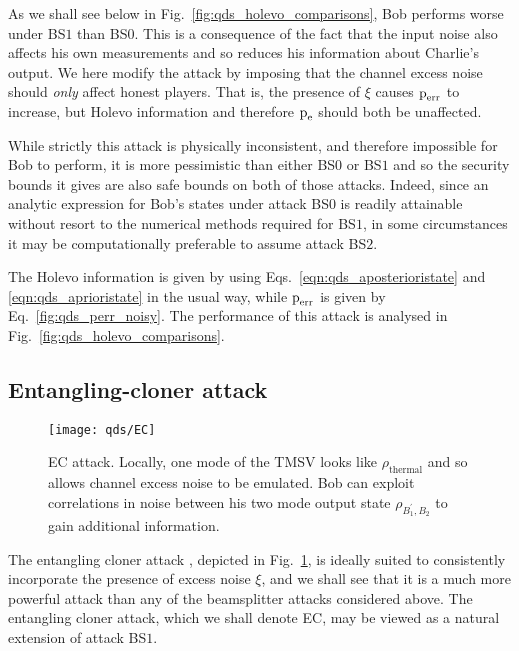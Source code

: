 As we shall see below in Fig.~\ref{fig:qds_holevo_comparisons}, Bob performs worse under BS$1$ than BS$0$. This is a consequence of the fact that the input noise also affects his own measurements and so reduces his information about Charlie's output. We here modify the attack by imposing that the channel excess noise should \emph{only} affect honest players. That is, the presence of $\xi$ causes $\text{p}_{\text{err}}$ to increase, but Holevo information and therefore $\text{p}_{\text{e}}$ should both be unaffected. 

While strictly this attack is physically inconsistent, and therefore impossible for Bob to perform, it is more pessimistic than either BS$0$ or BS$1$ and so the security bounds it gives are also safe bounds on both of those attacks. Indeed, since an analytic expression for Bob's states under attack BS$0$ is readily attainable without resort to the numerical methods required for BS$1$, %
in some circumstances it may be computationally preferable to assume attack BS$2$.

The Holevo information is given by using Eqs.~\ref{eqn:qds_aposterioristate} and \ref{eqn:qds_aprioristate} in the usual way, while $\text{p}_{\text{err}}$ is given by Eq.~\ref{fig:qds_perr_noisy}. The performance of this attack is analysed in Fig.~\ref{fig:qds_holevo_comparisons}.

\subsection{Entangling-cloner attack}
\begin{figure}[htp]
\centering
\texttt{[image: qds/EC]}
\caption{\label{fig:ec_attack} EC attack. Locally, one mode of the TMSV looks like $\rho_{\text{thermal}}$ and so allows channel excess noise to be emulated. Bob can exploit correlations in noise between his two mode output state $\rho_{B_1^\prime, B_2}$ to gain additional information.}
\end{figure}
The entangling cloner attack \cite{Grosshans2002, Grosshans2003}, depicted in Fig.~\ref{fig:ec_attack}, is ideally suited to consistently incorporate the presence of excess noise $\xi$, and we shall see that it is a much more powerful attack than any of the beamsplitter attacks considered above. The entangling cloner attack, which we shall denote EC, may be viewed as a natural extension of attack BS$1$.  %

